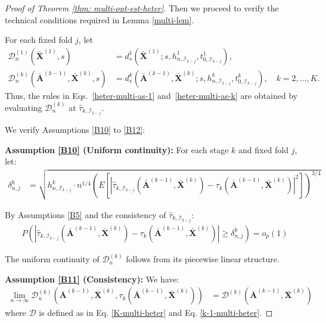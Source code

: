 \documentclass[11pt]{article}
\theoremstyle{referenceplain}
\theoremstyle{referencedefinition}
\theoremstyle{referenceremark}
\begin{document}
\begin{proof}[Proof of Theorem \ref{thm: multi-opt-est-heter}]

Then we proceed to verify the technical conditions required in Lemma \ref{multi-lem}.

{
For each fixed fold $j$, let
\begin{align*}
\mathcal{D}_n^{(1)}(\bar{\mathbf{X}}^{(1)},s)
&=d_s^1\!\left(\bar{\mathbf{X}}^{(1)};s,h_{n,\mathcal I_{3-j}}^1,t_{0,\mathcal I_{3-j}}^1\right),\\
\mathcal{D}_n^{(k)}(\bar{\mathbf{A}}^{(k-1)},\bar{\mathbf{X}}^{(k)},s)
&=d_s^k\!\left(\bar{\mathbf{A}}^{(k-1)},\bar{\mathbf{X}}^{(k)};s,h_{n,\mathcal I_{3-j}}^k,t_{0,\mathcal I_{3-j}}^k\right),\quad k=2,\dots,K.
\end{align*}
Thus, the rules in Eqs.~\eqref{heter-multi-as-1} and~\eqref{heter-multi-as-k} are obtained by evaluating $\mathcal D_n^{(k)}$ at $\widehat\tau_{k,\mathcal I_{3-j}}$.
}

We verify Assumptions \ref{B10} to \ref{B12}:

\textbf{Assumption \ref{B10} (Uniform continuity):}
For each stage $k$ {and fixed fold $j$}, let:
\begin{align}
    {\delta_{n,j}^k} &= \sqrt{h_{n,\mathcal{I}_{3-j}}^k \cdot n^{1/4}\left(E[|\widehat{\tau}_{k,\mathcal{I}_{3-j}}(\bar{\mathbf{A}}^{(k-1)},\bar{\mathbf{X}}^{(k)}) - \tau_k(\bar{\mathbf{A}}^{(k-1)},\bar{\mathbf{X}}^{(k)})|^2]\right)^{3/4}}
\end{align}

By Assumptions \ref{B5} and the consistency of $\widehat{\tau}_{k,\mathcal{I}_{3-j}}$:
\begin{align}
    P(|\widehat{\tau}_{k,\mathcal{I}_{3-j}}(\bar{\mathbf{A}}^{(k-1)},\bar{\mathbf{X}}^{(k)}) - \tau_k(\bar{\mathbf{A}}^{(k-1)},\bar{\mathbf{X}}^{(k)})| \geq {\delta_{n,j}^k}) = o_p(1)
\end{align}

The uniform continuity of {$\mathcal{D}_n^{(k)}$} follows from its {piecewise} linear structure.

\textbf{Assumption \ref{B11} (Consistency):}
We have:
\begin{align}
    \lim_{n \to \infty} {\mathcal{D}_n^{(k)}}(\bar{\mathbf{A}}^{(k-1)},\bar{\mathbf{X}}^{(k)},\tau_k(\bar{\mathbf{A}}^{(k-1)},\bar{\mathbf{X}}^{(k)})) &= \mathcal{D}^{(k)}(\bar{\mathbf{A}}^{(k-1)},\bar{\mathbf{X}}^{(k)})
\end{align}
 where $\mathcal{D}$ is defined as in Eq. \eqref{K-multi-heter} and  Eq. \eqref{k-1-multi-heter}.
 

\end{proof}
\end{document}
